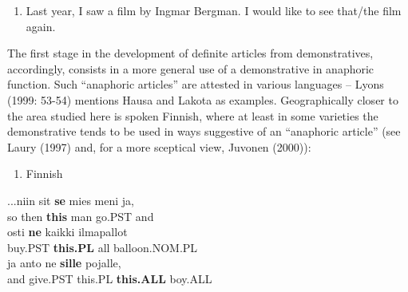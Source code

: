 \begin{enumerate} %
\item 
Last year, I saw a film by Ingmar Bergman. I would like to see that/the film again.

\end{enumerate} %
The first stage in the development of definite articles from demonstratives, accordingly, consists in a more general use of a demonstrative in anaphoric function. Such “anaphoric articles” are attested in various languages – Lyons (1999: 53-54) mentions Hausa and Lakota as examples. Geographically closer to the area studied here is spoken Finnish, where at least in some varieties the demonstrative tends to be used in ways suggestive of an “anaphoric article” (see Laury (1997) and, for a more sceptical view, Juvonen (2000)):

\begin{enumerate} %
\item 
Finnish

\end{enumerate} %
\ea\label{}
\gll ...niin  sit  \textbf{se} mies  meni  ja,\\


so  then  \textbf{this} man  go.PST  and\\ %


\ea\label{}
\gll osti  \textbf{ne} kaikki  ilmapallot\\


buy.PST  \textbf{this.PL} all  balloon.NOM.PL\\ %


\ea\label{}
\gll ja  anto  ne  \textbf{sille} pojalle,\\


and  give.PST  this.PL  \textbf{this.ALL} boy.ALL\\ %


